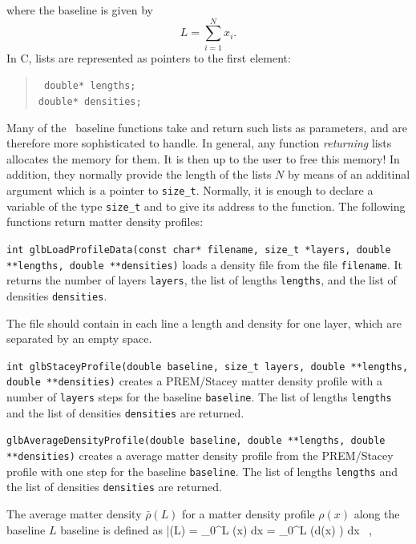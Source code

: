 where the baseline is given by
\begin{equation}
L = \sum\limits_{i=1}^N x_i.
\end{equation}
In C, lists are represented as pointers to the first element:
\begin{quote}
{\tt  
  double* lengths; \\
  double* densities;
}
\end{quote}
Many of the \GLOBES\ baseline functions take and return
such lists as parameters, and are therefore more sophisticated
to handle. In general, any function
{\em returning} lists allocates the memory for them.
It is then up to the user to free this memory!
In addition, they normally provide the length of the lists $N$
by means of an additinal argument which is a pointer to {\tt size\_t}. 
Normally, it is enough to declare
a variable of the type {\tt size\_t} and to give its address to the function.
The following functions return matter density profiles:
\begin{function}
{\tt int glbLoadProfileData(const char* filename, size\_t *layers, double **lengths, double **densities)} loads a density file from the file
{\tt filename}. It returns the number of layers {\tt layers}, the
list of lengths {\tt lengths}, and the list of densities {\tt densities}.
\end{function}
The file should contain in each line a length and density for one layer,
which are separated by an empty space.
\begin{function}
{\tt int glbStaceyProfile(double baseline, size\_t layers, double **lengths, double **densities)} creates a PREM/Stacey matter density profile with a
number of {\tt layers} steps for the baseline {\tt baseline}. The list of lengths {\tt lengths} and the list of densities {\tt densities} are returned.
\end{function}
\begin{function}
{\tt glbAverageDensityProfile(double baseline, double **lengths, 
double **densities)} creates a average matter density profile from the PREM/Stacey profile with one step for the baseline {\tt baseline}. The list of lengths {\tt lengths} and the list of densities {\tt densities} are returned.
\end{function}
The average matter density $\bar{\rho}(L)$ for a matter density profile $\rho(x)$ along the baseline $L$ baseline is defined as
\be
\bar{\rho}(L) =  \int\limits_{0}^L \rho(x) dx = 
 \int\limits_{0}^L \tilde{\rho}\left(d(x) \right) dx \, , 
